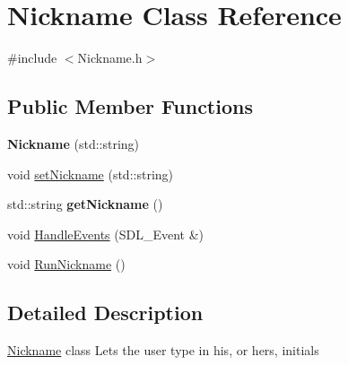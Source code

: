 \hypertarget{class_nickname}{\section{\-Nickname \-Class \-Reference}
\label{class_nickname}
}


{\ttfamily \#include $<$\-Nickname.\-h$>$}

\subsection*{\-Public \-Member \-Functions}
\begin{DoxyCompactItemize}
\item 
\hypertarget{class_nickname_a761f04459ace05b28c966256d4f4a354}{{\bfseries \-Nickname} (std\-::string)}\label{class_nickname_a761f04459ace05b28c966256d4f4a354}

\item 
void \hyperlink{class_nickname_a2fb3b4a0085e7899356d22b1cf2ef792}{set\-Nickname} (std\-::string)
\item 
\hypertarget{class_nickname_adcfd0985da2c89dde4776deade542a81}{std\-::string {\bfseries get\-Nickname} ()}\label{class_nickname_adcfd0985da2c89dde4776deade542a81}

\item 
void \hyperlink{class_nickname_a2ee127f924e7a4b65e77722a601ecc9a}{\-Handle\-Events} (\-S\-D\-L\-\_\-\-Event \&)
\item 
void \hyperlink{class_nickname_ac40d37ff811aed3c85522febb7396f70}{\-Run\-Nickname} ()
\end{DoxyCompactItemize}


\subsection{\-Detailed \-Description}
\hyperlink{class_nickname}{\-Nickname} class \-Lets the user type in his, or hers, initials 

